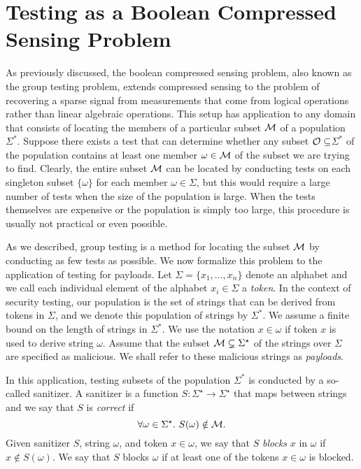 \section{Testing as a Boolean Compressed Sensing Problem}
As previously discussed, the boolean compressed sensing problem, also known as the group testing problem, extends compressed sensing to the problem of recovering a sparse signal from measurements that come from logical operations rather than linear algebraic operations. This setup has application to any domain that consists of locating the members of a particular subset $\cal{M}$ of a population $\Sigma^*$. Suppose there exists a test that can determine whether any subset $\cal{O}\subseteq$$\Sigma^*$ of the population contains at least one member $\omega\in\cal{M}$ of the subset we are trying to find. Clearly, the entire subset $\cal{M}$ can be located by conducting tests on each singleton subset $\{\omega\}$ for each member $\omega\in\Sigma$, but this would require a large number of tests when the size of the population is large.  When the tests themselves are expensive or the population is simply too large, this procedure is usually not practical or even possible.  

As we described, group testing is a method for locating the subset $\cal{M}$ by conducting as few tests as possible. We now formalize this problem to the application of testing for payloads. Let $\Sigma=\{ x_1,\ldots,x_n \}$ denote an alphabet and we call each individual element of the alphabet $x_i\in\Sigma$ a \emph{token}. In the context of security testing, our population is the set of strings that can be derived from tokens in $\Sigma$, and we denote this population of strings by $\Sigma^*$. We assume a finite bound on the length of strings in $\Sigma^*$. We use the notation $x\in\omega$ if token $x$ is used to derive string $\omega$. Assume that the subset ${\cal M} \subsetneq \Sigma^{\star}$ of the strings over $\Sigma$ are specified as malicious. We shall refer to these malicious strings as \emph{payloads}. 

In this application, testing subsets of the population $\Sigma^*$ is conducted by a so-called sanitizer. A sanitizer is a function 
$S \colon \Sigma^{\star} \rightarrow \Sigma^{\star}$ that maps between strings and we say that $S$ is \emph{correct} if
$$
\forall \omega \in \Sigma^{\star}.\ S(\omega) \notin {\cal M}.
$$ 
Given sanitizer $S$, string $\omega$, and token $x \in \omega$, we say that $S$ \emph{blocks} $x$ in $\omega$ if $x \notin S(\omega)$. We say that $S$ blocks $\omega$ if at least one of the tokens $x \in \omega$ is blocked.

